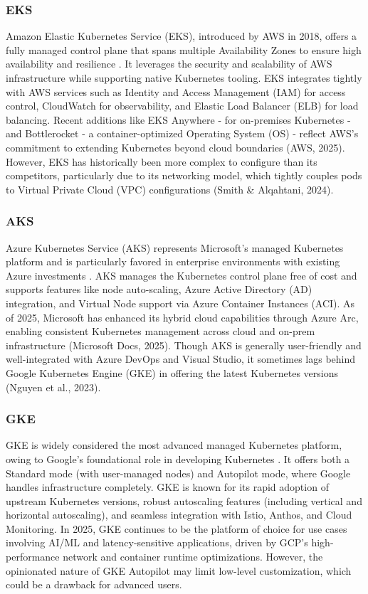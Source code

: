 \subsubsection{EKS}
Amazon Elastic Kubernetes Service (EKS), introduced by AWS in 2018, offers a fully managed control plane that spans multiple Availability Zones to ensure high availability and resilience \cite{aws-docs}. It leverages the security and scalability of AWS infrastructure while supporting native Kubernetes tooling. EKS integrates tightly with AWS services such as Identity and Access Management (IAM) for access control, CloudWatch for observability, and Elastic Load Balancer (ELB) for load balancing. Recent additions like EKS Anywhere - for on-premises Kubernetes - and Bottlerocket - a container-optimized Operating System (OS) - reflect AWS's commitment to extending Kubernetes beyond cloud boundaries (AWS, 2025). However, EKS has historically been more complex to configure than its competitors, particularly due to its networking model, which tightly couples pods to Virtual Private Cloud (VPC) configurations (Smith & Alqahtani, 2024).

\subsubsection{AKS}
Azure Kubernetes Service (AKS) represents Microsoft's managed Kubernetes platform and is particularly favored in enterprise environments with existing Azure investments \cite{azure-docs}. AKS manages the Kubernetes control plane free of cost and supports features like node auto-scaling, Azure Active Directory (AD) integration, and Virtual Node support via Azure Container Instances (ACI). As of 2025, Microsoft has enhanced its hybrid cloud capabilities through Azure Arc, enabling consistent Kubernetes management across cloud and on-prem infrastructure (Microsoft Docs, 2025). Though AKS is generally user-friendly and well-integrated with Azure DevOps and Visual Studio, it sometimes lags behind Google Kubernetes Engine (GKE) in offering the latest Kubernetes versions (Nguyen et al., 2023).

\subsubsection{GKE}
GKE is widely considered the most advanced managed Kubernetes platform, owing to Google's foundational role in developing Kubernetes \cite{gcp-docs}. It offers both a Standard mode (with user-managed nodes) and Autopilot mode, where Google handles infrastructure completely. GKE is known for its rapid adoption of upstream Kubernetes versions, robust autoscaling features (including vertical and horizontal autoscaling), and seamless integration with Istio, Anthos, and Cloud Monitoring. In 2025, GKE continues to be the platform of choice for use cases involving AI/ML and latency-sensitive applications, driven by GCP's high-performance network and container runtime optimizations. However, the opinionated nature of GKE Autopilot may limit low-level customization, which could be a drawback for advanced users.

